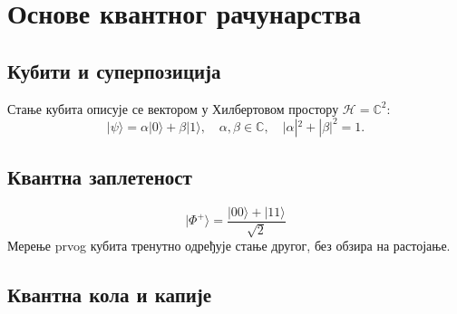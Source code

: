 \section{Основе квантног рачунарства}
\label{sec:kvant}


\subsection{Кубити и суперпозиција}


Стање кубита описује се вектором у Хилбертовом простору $\mathcal{H} = \mathbb{C}^2$:
\[
  |\psi\rangle = \alpha|0\rangle + \beta|1\rangle, \quad
  \alpha, \beta \in \mathbb{C}, \quad |\alpha|^2 + |\beta|^2 = 1.
\]


\subsection{Квантна заплетеност}


\begin{example}
\[
  |\Phi^+\rangle = \frac{|00\rangle + |11\rangle}{\sqrt{2}}
\]
Мерење prvog кубита тренутно одређује стање другог, без обзира на растојање.
\end{example}

\subsection{Квантна кола и капије}

